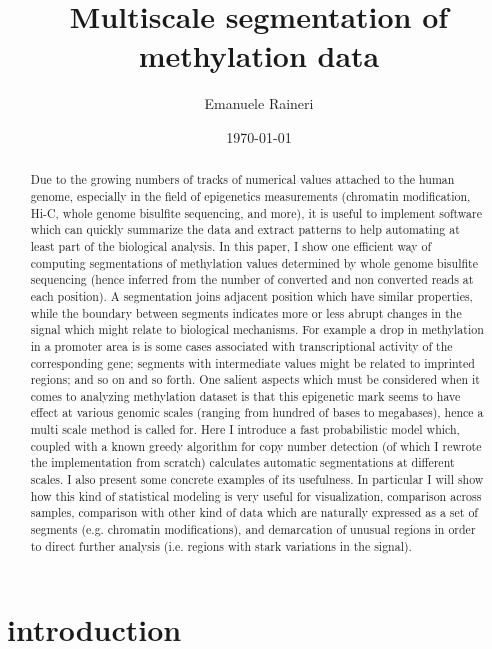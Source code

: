 \documentclass[11pt]{amsart}
\begin{document}
\title{Multiscale segmentation of methylation data}
\author{Emanuele Raineri}
\date{\today}
\maketitle

\begin{abstract}
Due to the growing numbers of tracks of numerical values attached to the 
human genome, especially in the field of epigenetics measurements 
(chromatin modification,
Hi-C, whole genome bisulfite sequencing, and more), 
it is useful to implement software 
which can quickly summarize the data and extract patterns to help 
automating at least  part of the biological analysis. 
In this paper, I show one efficient way of computing 
segmentations of methylation values determined by 
whole genome bisulfite sequencing
(hence inferred from the number of converted and non converted reads 
at each position).  
A segmentation joins adjacent position
which have similar properties, while the boundary between segments 
indicates more or less abrupt changes
in the signal which might relate to biological mechanisms. 
For example
a drop in methylation in a promoter area is is some cases associated with 
transcriptional activity of the corresponding gene; 
segments with intermediate values might be related to imprinted regions; 
and so on and so forth.
One salient aspects which must be considered when it comes to 
analyzing methylation dataset is that this epigenetic mark seems 
to have effect at various genomic scales 
(ranging from hundred of bases to megabases), hence a multi scale method 
is called for. 
Here I introduce a fast probabilistic model which, coupled with a known greedy 
algorithm for copy number detection 
(of which I rewrote the implementation from scratch) 
calculates automatic segmentations at different scales.
I also present some concrete examples of its usefulness. 
In particular I will show how this 
kind of statistical modeling is very useful for 
visualization, comparison across samples,
comparison with other kind of data which are naturally expressed as a set of 
segments (e.g. chromatin modifications),  and demarcation of unusual regions in 
order to direct further analysis (i.e. regions with stark variations in the signal).
\end{abstract}

\section{introduction}
\end{document}

